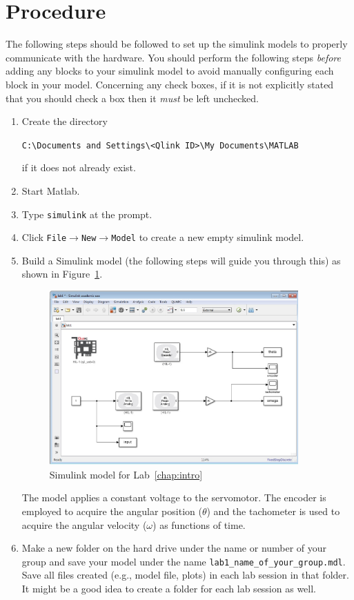 \section{Procedure}

The following steps should be followed to set up the simulink models to
properly communicate with the hardware.  You should perform the following
steps \emph{before} adding any blocks to your simulink model to avoid
manually configuring each block in your model.  Concerning any check boxes,
if it is not explicitly stated that you should check a box then it
\emph{must} be left unchecked.
\begin{enumerate}
\item Create the directory 
\begin{center}
\verb|C:\Documents and Settings\<Qlink ID>\My Documents\MATLAB|
\end{center} 
if it does not already exist.
\item Start \textsf{Matlab}.
\item Type \verb|simulink| at the prompt.
\item Click \verb|File|$\to$\verb|New|$\to$\verb|Model| to create a new empty
simulink model.
\item Build a \textsf{Simulink} model (the following steps will guide you
through this) as shown in Figure~\ref{fig:lab1}\@.
\begin{figure}[htbp]
\centering
\includegraphics[width=0.9\textwidth]{pix/lab1.PNG} 
\caption{\textsf{Simulink} model for Lab~\ref{chap:intro}}\label{fig:lab1}
\end{figure}%
The model applies a constant voltage to the servomotor.  The encoder is
employed to acquire the angular position ($\theta$) and the tachometer is
used to acquire the angular velocity ($\omega$) as functions of time.
\item Make a new folder on the hard drive under the name or number of your
group and save your model under the name \verb|lab1_name_of_your_group.mdl|.
Save all files created (e.g., model file, plots) in each lab session in that
folder.  It might be a good idea to create a folder for each lab session as
well.


\end{enumerate}
